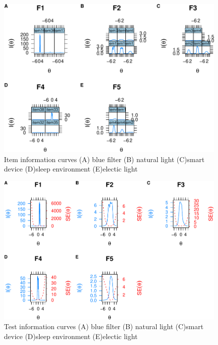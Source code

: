 \documentclass[
  english,
  man]{apa6}
\begin{document}
\begin{figure}
\includegraphics[width=1\linewidth,height=1.2\textheight]{manuscript_files/figure-latex/itmeinfo-1} \caption{Item information curves (A) blue filter (B) natural light (C)smart device (D)sleep environment (E)electic light}\label{fig:itmeinfo}
\end{figure}

\begin{figure}
\includegraphics[width=1\linewidth,height=1.2\textheight]{manuscript_files/figure-latex/Testinfo-1} \caption{Test information curves (A) blue filter (B) natural light (C)smart device (D)sleep environment (E)electic light}\label{fig:Testinfo}
\end{figure}
\end{document}
